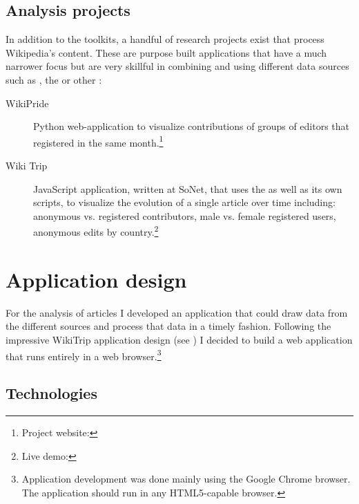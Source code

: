 \subsection{Analysis projects}\label{sub:analysisprojects}

In addition to the toolkits, a handful of research projects exist that process Wikipedia's content.
These are purpose built applications that have a much narrower focus but are very skillful in combining and using different data sources such as , the  or other :

\begin{description}
\item[WikiPride] Python web-application  to visualize contributions of groups of editors that registered in the same month.\footnote{Project website: }
\item[Wiki Trip] JavaScript application, written at SoNet, that uses the  as well as its own  scripts, to visualize the evolution of a single article over time including: anonymous vs. registered contributors, male vs. female registered users, anonymous edits by country.\footnote{Live demo: } 
\end{description}


\section{Application design}\label{sec:application}

For the analysis of articles I developed an application that could draw data from the different sources and process that data in a timely fashion.
Following the impressive WikiTrip application design (see ) I decided to build a web application that runs entirely in a web browser.\footnote{Application development was done mainly using the Google Chrome browser. The application should run in any \ac{HTML}5-capable browser.}

\subsection{Technologies}

